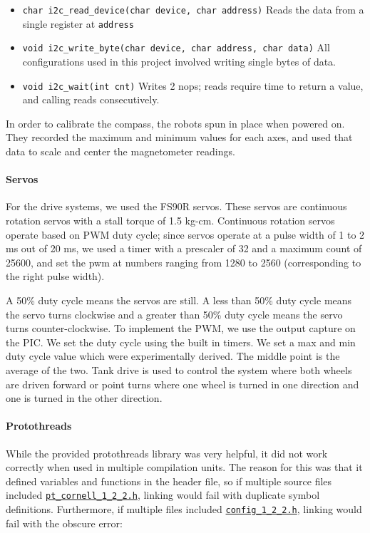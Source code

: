 \documentclass[]{article}
\providecommand{\tightlist}{%
  \setlength{\itemsep}{0pt}\setlength{\parskip}{0pt}}
\let\oldparagraph\paragraph
\renewcommand{\paragraph}[1]{\oldparagraph{#1}\mbox{}}
\begin{document}
\begin{itemize}
\tightlist
\item
  \texttt{char\ i2c\_read\_device(char\ device,\ char\ address)} Reads
  the data from a single register at \texttt{address}
\item
  \texttt{void\ i2c\_write\_byte(char\ device,\ char\ address,\ char\ data)}
  All configurations used in this project involved writing single bytes
  of data.
\item
  \texttt{void\ i2c\_wait(int\ cnt)} Writes 2 nops; reads require time
  to return a value, and calling reads consecutively.
\end{itemize}

In order to calibrate the compass, the robots spun in place when powered
on. They recorded the maximum and minimum values for each axes, and used
that data to scale and center the magnetometer readings.

\hypertarget{servos}{%
\paragraph{Servos}\label{servos}}

For the drive systems, we used the FS90R servos. These servos are
continuous rotation servos with a stall torque of 1.5 kg-cm. Continuous
rotation servos operate based on PWM duty cycle; since servos operate at
a pulse width of 1 to 2 ms out of 20 ms, we used a timer with a
prescaler of 32 and a maximum count of 25600, and set the pwm at numbers
ranging from 1280 to 2560 (corresponding to the right pulse width).

A 50\% duty cycle means the servos are still. A less than 50\% duty
cycle means the servo turns clockwise and a greater than 50\% duty cycle
means the servo turns counter-clockwise. To implement the PWM, we use
the output capture on the PIC. We set the duty cycle using the built in
timers. We set a max and min duty cycle value which were experimentally
derived. The middle point is the average of the two. Tank drive is used
to control the system where both wheels are driven forward or point
turns where one wheel is turned in one direction and one is turned in
the other direction.

\hypertarget{protothreads}{%
\paragraph{Protothreads}\label{protothreads}}

While the provided protothreads library was very helpful, it did not
work correctly when used in multiple compilation units. The reason for
this was that it defined variables and functions in the header file, so
if multiple source files included
\href{generated/pt_cornell_1_2_2.h.html}{\texttt{pt\_cornell\_1\_2\_2.h}},
linking would fail with duplicate symbol definitions. Furthermore, if
multiple files included
\href{generated/config_1_2_2.h.html}{\texttt{config\_1\_2\_2.h}},
linking would fail with the obscure error:
\end{document}
